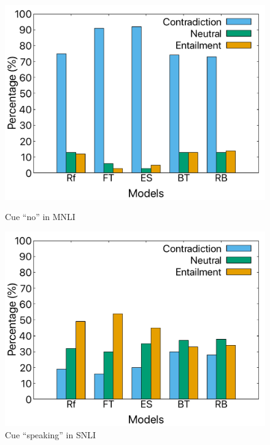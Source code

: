 \begin{figure}[th]
\centering
\begin{minipage}[b]{0.40\linewidth}
\centering
\includegraphics[width=\columnwidth]{picture/no-mnli.pdf}
\caption*{Cue ``no'' in MNLI} 
\label{fig:cue_no} 
\end{minipage}
\hspace{0.5cm} 
\begin{minipage}[b]{0.40\linewidth} 
\centering 
\includegraphics[width=\columnwidth]{picture/speaking-snli.pdf} 
\caption*{Cue ``speaking'' in SNLI}
\label{fig:cue_speaking}
\end{minipage}

\vspace{0.5cm}


\end{figure}
